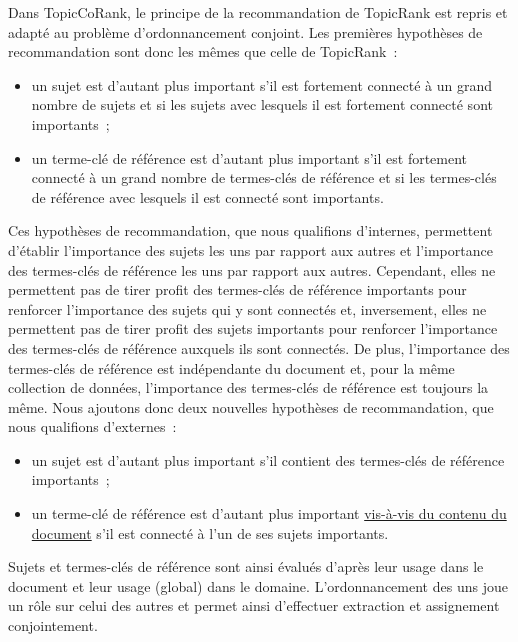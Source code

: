         Dans TopicCoRank, le principe de la recommandation  de TopicRank est
        repris et adapté au problème d'ordonnancement conjoint. Les premières
        hypothèses de recommandation sont donc les mêmes que celle de
        TopicRank~:
        \begin{itemize}
          \item{un sujet est d'autant plus important s'il est fortement connecté
                à un grand nombre de sujets et si les sujets avec lesquels il
                est fortement connecté sont importants~;}
          \item{un terme-clé de référence est d'autant plus important s'il est
                fortement connecté à un grand nombre de termes-clés de référence
                et si les termes-clés de référence avec lesquels il est connecté
                sont importants.}
        \end{itemize}
        Ces hypothèses de recommandation, que nous qualifions d'internes,
        permettent d'établir l'importance des sujets les uns par rapport aux
        autres et l'importance des termes-clés de référence les uns par rapport
        aux autres. Cependant, elles ne permettent pas de tirer profit des
        termes-clés de référence importants pour renforcer l'importance des
        sujets qui y sont connectés et, inversement, elles ne permettent pas de
        tirer profit des sujets importants pour renforcer l'importance des
        termes-clés de référence auxquels ils sont connectés. De plus,
        l'importance des termes-clés de référence est indépendante du document
        et, pour la même collection de données, l'importance des termes-clés de
        référence est toujours la même. Nous ajoutons donc deux nouvelles
        hypothèses de recommandation, que nous qualifions d'externes~:
        \begin{itemize}
          \item{un sujet est d'autant plus important s'il contient des
                termes-clés de référence importants~;}
          \item{un terme-clé de référence est d'autant plus important
                \underline{vis-à-vis du contenu du document} s'il est connecté à
                l'un de ses sujets importants.}
        \end{itemize}
        Sujets et termes-clés de référence sont ainsi évalués d'après leur usage
        dans le document et leur usage (global) dans le domaine.
        L'ordonnancement des uns joue un rôle sur celui des autres et permet
        ainsi d'effectuer extraction et assignement conjointement.

